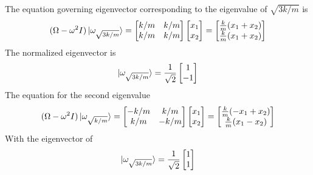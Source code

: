 \documentclass[../main.tex]{subfiles}
\begin{document}
The equation governing eigenvector corresponding to the eigenvalue of $\sqrt{3k/m}$ is
\begin{equation*}
	(\Omega- \omega^2 I)\ket{\omega_{\sqrt{3k/m}}}=
	\begin{bmatrix}
		k/m & k/m \\
		k/m & k/m \\
	\end{bmatrix}
	\begin{bmatrix}
		x_1 \\
		x_2 \\
	\end{bmatrix}
	=
	\begin{bmatrix}
		\frac{k }{ m }(x_1+x_2) \\
		\frac{k }{ m }(x_1+x_2) \\
	\end{bmatrix}
\end{equation*}
The normalized eigenvector is
\begin{equation*}
	\ket{\omega_{\sqrt{3k/m}}}=
	\frac{1 }{\sqrt{2}}
	\begin{bmatrix}
		1  \\
		-1 \\
	\end{bmatrix}
\end{equation*}
The equation for the second eigenvalue
\begin{equation*}
	(\Omega- \omega^2 I)\ket{\omega_{\sqrt{k/m}}}=
	\begin{bmatrix}
		-k/m & k/m  \\
		k/m  & -k/m \\
	\end{bmatrix}
	\begin{bmatrix}
		x_1 \\
		x_2 \\
	\end{bmatrix}
	=
	\begin{bmatrix}
		\frac{k }{ m }(-x_1+x_2) \\
		\frac{k }{ m }(x_1-x_2)  \\
	\end{bmatrix}
\end{equation*}
With the eigenvector of
\begin{equation*}
	\ket{\omega_{\sqrt{3k/m}}}=
	\frac{1 }{\sqrt{2}}
	\begin{bmatrix}
		1 \\
		1 \\
	\end{bmatrix}
\end{equation*}
\end{document}
